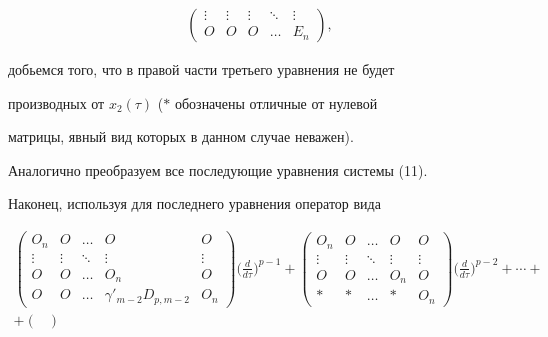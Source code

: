 \begin{pf}
\begin{multline*}
\begin{pmatrix}
\vdots & \vdots & \vdots & \ddots & \vdots\\


O & O & O & \dotsc & E_n 


\end{pmatrix}


,


\end{multline*}


добьемся того, что в правой части третьего уравнения не будет 


производных от $x_2(\tau)$ ($*$ обозначены отличные от нулевой


матрицы, явный вид которых в данном случае неважен).


Аналогично преобразуем все последующие уравнения системы (11).


Наконец, используя для последнего уравнения оператор вида


\begin{multline*}


\begin{pmatrix}


O_n & O & \dotsc & O & O\\


\vdots & \vdots & \ddots & \vdots & \vdots\\


O & O & \dotsc & O_n & O\\


O & O & \dotsc & \gamma'_{m-2}D_{p,m-2} & O_n


\end{pmatrix}


\bigg(\frac{d}{d\tau}\bigg)^{p-1} +


\begin{pmatrix}


O_n & O & \dotsc & O & O\\


\vdots & \vdots & \ddots & \vdots & \vdots\\


O & O & \dotsc & O_n & O\\


\ast & * & \dotsc & * & O_n


\end{pmatrix}


\bigg(\frac{d}{d\tau}\bigg)^{p-2} + \dotsb + \\


%


+


\begin{pmatrix}



\end{pmatrix}
\end{multline*}
\end{pf}
